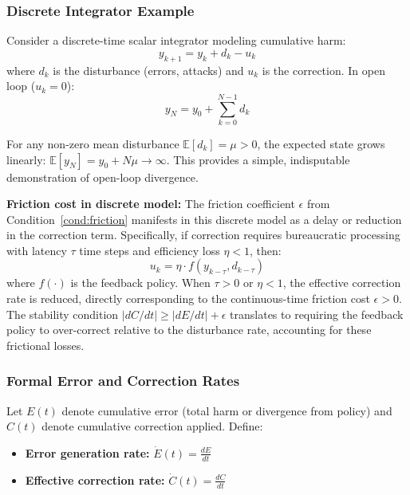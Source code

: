 \subsubsection{Discrete Integrator Example}

Consider a discrete-time scalar integrator modeling cumulative harm:
\begin{equation}
y_{k+1} = y_k + d_k - u_k
\end{equation}
where $d_k$ is the disturbance (errors, attacks) and $u_k$ is the correction. In open loop ($u_k = 0$):
\begin{equation}
y_N = y_0 + \sum_{k=0}^{N-1} d_k
\end{equation}

For any non-zero mean disturbance $\mathbb{E}[d_k] = \mu > 0$, the expected state grows linearly: $\mathbb{E}[y_N] = y_0 + N\mu \to \infty$. This provides a simple, indisputable demonstration of open-loop divergence.

\textbf{Friction cost in discrete model:} The friction coefficient $\epsilon$ from Condition~\ref{cond:friction} manifests in this discrete model as a delay or reduction in the correction term. Specifically, if correction requires bureaucratic processing with latency $\tau$ time steps and efficiency loss $\eta < 1$, then:
\begin{equation}
u_k = \eta \cdot f(y_{k-\tau}, d_{k-\tau})
\end{equation}
where $f(\cdot)$ is the feedback policy. When $\tau > 0$ or $\eta < 1$, the effective correction rate is reduced, directly corresponding to the continuous-time friction cost $\epsilon > 0$. The stability condition $|dC/dt| \geq |dE/dt| + \epsilon$ translates to requiring the feedback policy to over-correct relative to the disturbance rate, accounting for these frictional losses.

\subsubsection{Formal Error and Correction Rates}

Let $E(t)$ denote cumulative error (total harm or divergence from policy) and $C(t)$ denote cumulative correction applied. Define:
\begin{itemize}
    \item \textbf{Error generation rate:} $\dot{E}(t) = \frac{dE}{dt}$
    \item \textbf{Effective correction rate:} $\dot{C}(t) = \frac{dC}{dt}$
\end{itemize}

